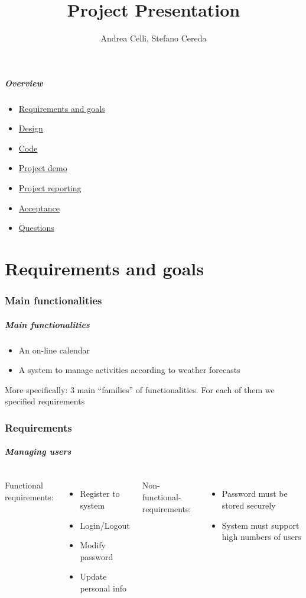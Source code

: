 \documentclass[professionalfonts]{beamer}
\title{Project Presentation}
\author{Andrea Celli, Stefano Cereda}
\institute[PoliMi]{Politecnico di Milano}
\begin{document}
\begin{frame}
\maketitle
\end{frame}

\begin{frame}
\frametitle{Overview}
\begin{itemize}
\item \hyperref[part:RASD]{Requirements and goals}
\item \hyperref[part:Design]{Design}
\item \hyperref[part:Code]{Code}
\item \hyperref[part:demo]{Project demo}
\item \hyperref[part:Reporting]{Project reporting}
\item \hyperref[part:Acceptance]{Acceptance}
\item \hyperref[part:questions]{Questions}
\end{itemize}
\end{frame}

\part{Requirements and goals}
\label{part:RASD}
\section{Main functionalities}
\begin{frame}
\frametitle{Main functionalities}
\begin{itemize}
\item An on-line calendar
\item A system to manage activities according to weather forecasts
\end{itemize}
More specifically: \alert{3 main ``families'' of functionalities}. For each of them we specified requirements
\end{frame}

\section{Requirements}
\begin{frame}
\frametitle{Managing users}
\begin{columns}[c]
Functional requirements:
\begin{itemize}
\item Register to system
\item Login/Logout
\item Modify password
\item Update personal info
\end{itemize}
Non-functional-requirements:
\begin{itemize}
\item Password must be stored securely
\item System must support high numbers of users
\end{itemize}
\end{columns}
\end{frame}
\end{document}
